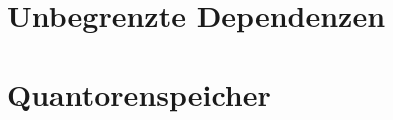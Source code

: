 \documentclass[handout,aspectratio=1610,dvipsnames]{beamer}
\begin{document}
  \section{Unbegrenzte Dependenzen}
  \let\woopsi\section\let\section\subsection\let\subsection\subsubsection
  
  \let\subsection\section\let\section\woopsi

  \section{Quantorenspeicher}
  \let\woopsi\section\let\section\subsection\let\subsection\subsubsection
  
  \let\subsection\section\let\section\woopsi
\end{document}
